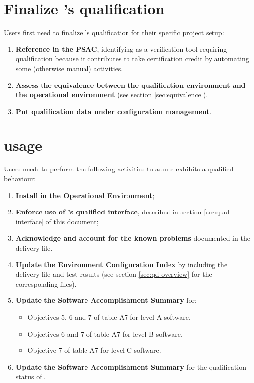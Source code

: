 \documentclass {report}
\begin{document}
\section{Finalize \xcov{}'s qualification}

Users first need to finalize \xcov{}'s qualification for their specific
project setup:

\begin{enumerate}
%
\item \textbf{Reference \xcov{} in the PSAC}, identifying \xcov{} as a
  verification tool requiring qualification because it contributes to take
  certification credit by automating some (otherwise manual) activities.
%
\item \textbf{Assess the equivalence between the qualification environment and
  the operational environment} (see section \ref{sec:equivalence}).
%
\item \textbf{Put qualification data under configuration management}.
\end{enumerate}

\section{\xcov{} usage}

Users needs to perform the following activities to assure \xcov{} exhibits
a qualified behaviour:

\begin{enumerate}
\item \textbf{Install \xcov{} in the Operational Environment};
%
\item \textbf{Enforce use of \xcov{}'s qualified interface}, described
  in section \ref{sec:qual-interface} of this document;
%
\item \textbf{Acknowledge and account for the known problems} documented in
  the delivery file.
%
\item \textbf{Update the Environment Configuration Index} by including the
  delivery file and test results (see section \ref{sec:qd-overview} for the
  corresponding files).
%
\item \textbf{Update the Software Accomplishment Summary} for:
\begin{itemize}
\item Objectives 5, 6 and 7 of table A7 for level A software.
\item Objectives 6 and 7 of table A7 for level B software.
\item Objective 7 of table A7 for level C software.
\end{itemize}
%
\item \textbf{Update the Software Accomplishment Summary} for the
  qualification status of \xcov{}.
\end{enumerate}
\end{document}
